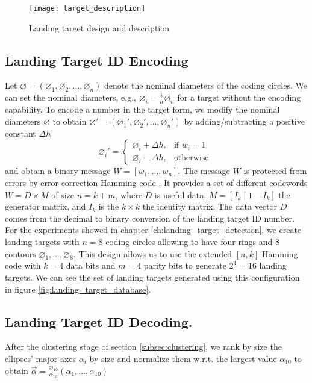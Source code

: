 \begin{figure}[!ht]
\centering
\texttt{[image: target\_description]}
\caption{Landing target design and description}
\label{fig:target_description}
\end{figure}

\subsection{Landing Target ID Encoding}
Let $\varnothing=\left( \diameter_{1}, \diameter_{2},\ldots,\diameter_{n}\right) $ denote the nominal diameters of the coding circles. We can set the nominal diameters, e.g., $\diameter_{i}=\frac{i}{n}\diameter_{n}$ for a target without the encoding capability. To encode a number in the target form, we modify the nominal diameters $\varnothing$ to obtain $\varnothing'=\left( \diameter_{1}', \diameter_{2}',\ldots,\diameter_{n}'\right) $ by adding/subtracting a positive constant $\Delta h$
\begin{equation}
\diameter_{i}'=
\begin{cases}
  \diameter_{i}+\Delta h, & \text{if } w_{i}=1 \\
  \diameter_{i}- \Delta h, & \text{otherwise }
\end{cases}
\end{equation}
and obtain a binary message  $W=[w_{1}, \dots,w_{n}]$. The message $W$ is protected from errors by error-correction Hamming code  \citep{Hamming:BSTJ:1950}. It provides a set of different codewords $W= D\times M$ of size $n=k+m$, where $D$ is useful data, $ M=[I_{k}\mid 1-I_{k}]$ the generator matrix, and $I_{k}$ is the $k\times k$ the identity matrix. The data vector $D$ comes from the decimal to binary conversion of the landing target ID number. For the experiments showed in chapter \ref{ch:landing_target_detection}, we create landing targets with $n=8$ coding circles allowing to have four rings and $8$ contours $\diameter_{1}, \ldots, \diameter_{8}$. This design allows us to use the extended $[n,k]$ Hamming code with $k=4$ data bits and $m=4$ parity bits to generate $2^{4}=16$ landing targets. We can see the set of landing targets generated using this configuration in figure \ref{fig:landing_target_database}.

\subsection{Landing Target ID Decoding.}
After the clustering stage of section \ref{subsec:clustering}, we rank by size the ellipses' major axes $\alpha_i$ by size and normalize them w.r.t. the largest value $\alpha_{10}$ to obtain %
$\vec{\alpha}=  \frac{\diameter_{10}}{\alpha_{10}} (\alpha_{1}, \ldots, \alpha_{10})$

